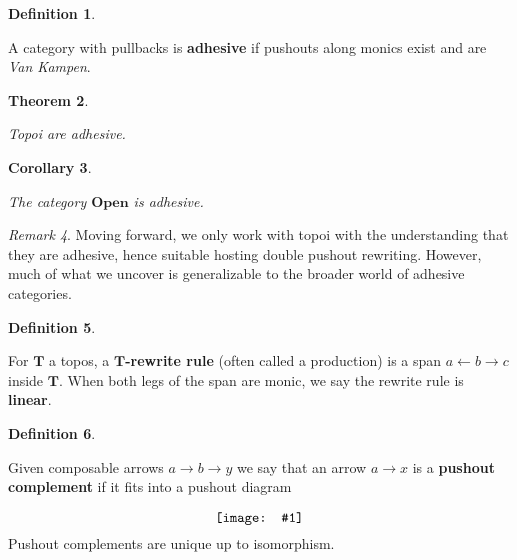 \documentclass{amsart}
\newcommand{\defn}[1]{\textbf{#1}}
\newcommand{\cat}[1]{\mathbf{#1}}
\newcommand{\diagram}[1]{\raisebox{-0.5\height}{\texttt{[image: \#1]}}}
\newcommand{\OpenOb}{\mathbf{Open} }
\newtheorem{theorem}{Theorem}[section]
\newtheorem{corollary}[theorem]{Corollary}
\theoremstyle{remark}
\newtheorem{remark}[theorem]{Remark}
\theoremstyle{definition}
\newtheorem{definition}[theorem]{Definition}
\begin{document}
\begin{definition}
\label{df:dpo_adhesive-category} 
	
  A category with pullbacks is \defn{adhesive} if pushouts along
  monics exist and are \emph{Van Kampen}.

\end{definition} 

\begin{theorem}
\label{thm:dpo_topoi-adhesive} 
	
  Topoi are adhesive.
	
\end{theorem}


\begin{corollary}
\label{thm:dpo_category-StrCsp-adhsv}
 	
  The category $ \OpenOb $ is adhesive.
 	
\end{corollary}

\begin{remark}

  Moving forward, we only work with topoi with the understanding that
  they are adhesive, hence suitable hosting double pushout rewriting.
  However, much of what we uncover is generalizable to the broader
  world of adhesive categories.
  
\end{remark}


\begin{definition}
\label{df:dpo_rewrite-rule} 
	
  For $ \cat{T} $ a topos, a \defn{$ \cat{T} $-rewrite rule}
  (often called a production) is a span $ a \gets b \to c $ inside
  $ \cat{T} $.  When both legs of the span are monic, we say the rewrite
  rule is \defn{linear}.
  
\end{definition}	

\begin{definition}
\label{df_rw_pushout-complement} 
	
  Given composable arrows $ a \to b \to y $ we say that an arrow
  $ a \to x $ is a \defn{pushout complement} if it fits into a pushout
  diagram
  \[
    \diagram{diag_rw_pushout-comp}
  \]
  Pushout complements are unique up to isomorphism.
  
\end{definition}
\end{document}
